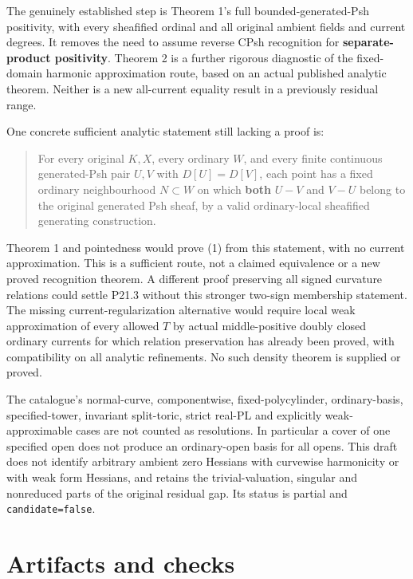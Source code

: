 \documentclass[
  11pt,
]{article}
\begin{document}
The genuinely established step is Theorem 1's full bounded-generated-Psh
positivity, with every sheafified ordinal and all original ambient
fields and current degrees. It removes the need to assume reverse CPsh
recognition for \textbf{separate-product positivity}. Theorem 2 is a
further rigorous diagnostic of the fixed-domain harmonic approximation
route, based on an actual published analytic theorem. Neither is a new
all-current equality result in a previously residual range.

One concrete sufficient analytic statement still lacking a proof is:

\begin{quote}
For every original \(K,X\), every ordinary \(W\), and every finite
continuous generated-Psh pair \(U,V\) with \(D[U]=D[V]\), each point has
a fixed ordinary neighbourhood \(N\subset W\) on which \textbf{both}
\(U-V\) and \(V-U\) belong to the original generated Psh sheaf, by a
valid ordinary-local sheafified generating construction.
\end{quote}

Theorem 1 and pointedness would prove (1) from this statement, with no
current approximation. This is a sufficient route, not a claimed
equivalence or a new proved recognition theorem. A different proof
preserving all signed curvature relations could settle P21.3 without
this stronger two-sign membership statement. The missing
current-regularization alternative would require local weak
approximation of every allowed \(T\) by actual middle-positive doubly
closed ordinary currents for which relation preservation has already
been proved, with compatibility on all analytic refinements. No such
density theorem is supplied or proved.

The catalogue's normal-curve, componentwise, fixed-polycylinder,
ordinary-basis, specified-tower, invariant split-toric, strict real-PL
and explicitly weak-approximable cases are not counted as resolutions.
In particular a cover of one specified open does not produce an
ordinary-open basis for all opens. This draft does not identify
arbitrary ambient zero Hessians with curvewise harmonicity or with weak
form Hessians, and retains the trivial-valuation, singular and
nonreduced parts of the original residual gap. Its status is partial and
\texttt{candidate=false}.

\section{Artifacts and checks}\label{artifacts-and-checks}
\end{document}
